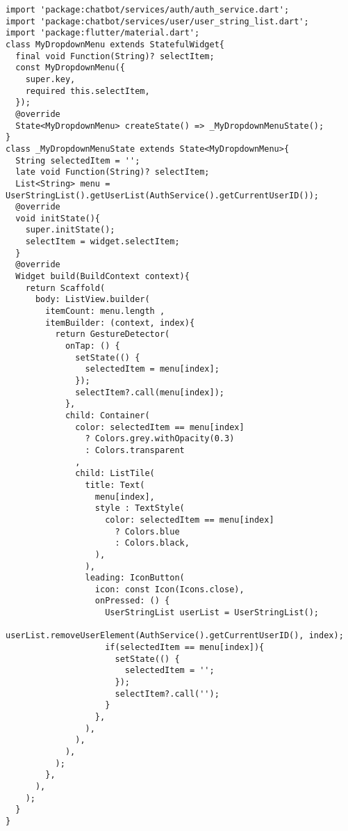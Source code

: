 \begin{lstlisting}[style=pythonstyle,caption={Codice del my\_dropdown\_menu.dart}, label={lst:dropdownmenu}]
import 'package:chatbot/services/auth/auth_service.dart';
import 'package:chatbot/services/user/user_string_list.dart';
import 'package:flutter/material.dart';
class MyDropdownMenu extends StatefulWidget{
  final void Function(String)? selectItem;
  const MyDropdownMenu({
    super.key,
    required this.selectItem,
  });
  @override
  State<MyDropdownMenu> createState() => _MyDropdownMenuState();
}
class _MyDropdownMenuState extends State<MyDropdownMenu>{
  String selectedItem = '';
  late void Function(String)? selectItem;
  List<String> menu = UserStringList().getUserList(AuthService().getCurrentUserID());
  @override
  void initState(){
    super.initState();
    selectItem = widget.selectItem;
  }
  @override
  Widget build(BuildContext context){
    return Scaffold(
      body: ListView.builder(
        itemCount: menu.length ,
        itemBuilder: (context, index){
          return GestureDetector(
            onTap: () {
              setState(() {
                selectedItem = menu[index];
              });
              selectItem?.call(menu[index]);
            },
            child: Container(
              color: selectedItem == menu[index]
                ? Colors.grey.withOpacity(0.3)
                : Colors.transparent
              ,
              child: ListTile(
                title: Text(
                  menu[index],
                  style : TextStyle(
                    color: selectedItem == menu[index]
                      ? Colors.blue
                      : Colors.black,
                  ),
                ),
                leading: IconButton(
                  icon: const Icon(Icons.close),
                  onPressed: () {
                    UserStringList userList = UserStringList();
                    userList.removeUserElement(AuthService().getCurrentUserID(), index);
                    if(selectedItem == menu[index]){
                      setState(() {
                        selectedItem = '';
                      });
                      selectItem?.call('');
                    }
                  },
                ),
              ),
            ),
          );
        },
      ),
    );
  }
}
\end{lstlisting}
